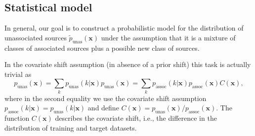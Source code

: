 \documentclass[12pt, a4paper]{article}
\newcommand{\be}{\begin{equation}}
\newcommand{\ee}{\end{equation}}
\newcommand{\bx}{\textbf{x}}
\begin{document}
\subsection{Statistical model}
\label{sec:stat-model}

In general, our goal is to construct a probabilistic model for the distribution of unassociated sources $\tilde{p}_\textrm{unas}(\bx)$ under the assumption that it is a mixture of classes of associated sources plus a possible new class of sources.

In the covariate shift assumption (in absence of a prior shift) this task is actually trivial as
\be
\label{eq:cov0}
p_\textrm{unas}(\bx) 
= \sum_k p_\textrm{unas}(k|\bx) p_\textrm{unas}(\bx) 
= \sum_k p_\textrm{assoc}(k|\bx) p_\textrm{assoc}(\bx) C(\bx),
\ee
where in the second equality we use the covariate shift assumption $p_\textrm{assoc}(k|\bx) = p_\textrm{unas}(k|\bx)$ and define $C(\bx) = p_\textrm{unas}(\bx) / p_\textrm{assoc}(\bx)$.
The function $C(\bx)$ describes the covariate shift, i.e., the difference in the distribution of training and target datasets.
\end{document}
